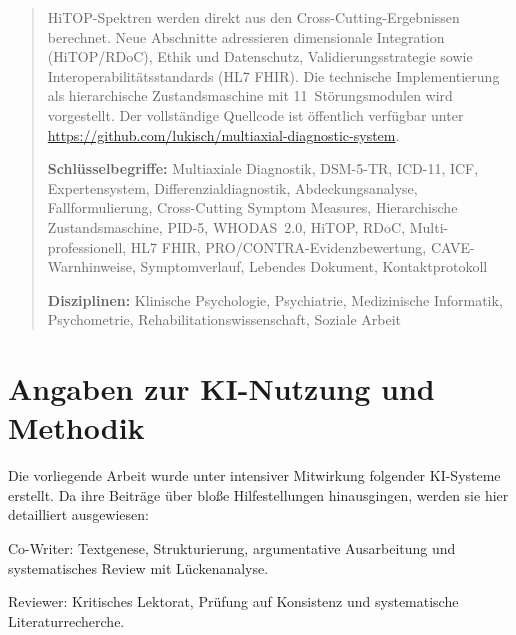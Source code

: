 \documentclass[11pt,a4paper]{article}
\begin{document}
\begin{abstract}
HiTOP-Spektren werden direkt aus den Cross-Cutting-Ergebnissen berechnet. Neue Abschnitte adressieren dimensionale Integration (HiTOP/RDoC), Ethik und Datenschutz, Validierungsstrategie sowie Interoperabilit\"atsstandards (HL7 FHIR). Die technische Implementierung als hierarchische Zustandsmaschine mit 11~St\"orungsmodulen wird vorgestellt. Der vollst\"andige Quellcode ist \"offentlich verf\"ugbar unter \url{https://github.com/lukisch/multiaxial-diagnostic-system}.

\vspace{0.5em}
\noindent \textbf{Schl\"usselbegriffe:} Multiaxiale Diagnostik, DSM-5-TR, ICD-11, ICF, Expertensystem, Differenzialdiagnostik, Abdeckungsanalyse, Fallformulierung, Cross-Cutting Symptom Measures, Hierarchische Zustandsmaschine, PID-5, WHODAS~2.0, HiTOP, RDoC, Multi-professionell, HL7 FHIR, PRO/CONTRA-Evidenzbewertung, CAVE-Warnhinweise, Symptomverlauf, Lebendes Dokument, Kontaktprotokoll

\vspace{0.5em}
\noindent \textbf{Disziplinen:} Klinische Psychologie, Psychiatrie, Medizinische Informatik, Psychometrie, Rehabilitationswissenschaft, Soziale Arbeit
\end{abstract}

\newpage
\tableofcontents
\newpage

\section*{Angaben zur KI-Nutzung und Methodik}

Die vorliegende Arbeit wurde unter intensiver Mitwirkung folgender KI-Systeme erstellt. Da ihre Beitr\"age \"uber blo\ss{}e Hilfestellungen hinausgingen, werden sie hier detailliert ausgewiesen:

\begin{description}[style=nextline, leftmargin=2cm]
\item[\textbf{Claude Opus 4.6} (Anthropic)] Co-Writer: Textgenese, Strukturierung, argumentative Ausarbeitung und systematisches Review mit L\"uckenanalyse.
\item[\textbf{Gemini} (Google DeepMind) \& \textbf{Copilot} (Microsoft)] Reviewer: Kritisches Lektorat, Pr\"ufung auf Konsistenz und systematische Literaturrecherche.
\end{description}
\end{document}
